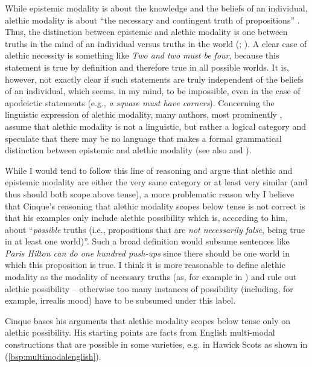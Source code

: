 \noindent While epistemic modality is about the knowledge and the beliefs of an individual, alethic modality is about ``the necessary and contingent truth of propositions'' \citep[8--9]{nuyts2006modality}. Thus, the distinction between epistemic and alethic modality is one between truths in the mind of an individual versus truths in the world (\citealt[11]{palmer1986mood}; \citealt[9]{nuyts2006modality}). A clear case of alethic necessity is something like \textit{Two and two must be four}, because this statement is true by definition and therefore true in all possible worlds. It is, however, not exactly clear if such statements are truly independent of the beliefs of an individual, which seems, in my mind, to be impossible, even in the case of apodeictic statements (e.g., \textit{a square must have corners}). Concerning the linguistic expression of alethic modality, many authors, most prominently \citet[11]{palmer1986mood}, assume that alethic modality is not a linguistic, but rather a logical category and speculate that there may be no language that makes a formal grammatical distinction between epistemic and alethic modality (see also \citealt[28]{nuyts2000epistemic} and \citealt{von2006modality}).

While I would tend to follow this line of reasoning and argue that alethic and epistemic modality are either the very same category or at least very similar (and thus should both scope above tense), a more problematic reason why I believe that Cinque's reasoning that alethic modality scopes below tense is not correct is that his examples only include alethic possibility which is, according to him, about ``\textit{possible} truths (i.e., propositions that are \textit{not necessarily false}, being true in at least one world)''. Such a broad definition would subsume sentences like \textit{Paris Hilton can do one hundred push-ups} since there should be one world in which this proposition is true. I think it is more reasonable to define alethic modality as the modality of necessary truths (as, for example in \citealt{nuyts2000epistemic}) and rule out alethic possibility -- otherwise too many instances of possibility (including, for example, irrealis mood) have to be subsumed under this label. 

Cinque bases his arguments that alethic modality scopes below tense only on alethic possibility. His starting points are facts from English multi-modal constructions that are possible in some varieties, e.g. in Hawick Scots as shown in (\ref{bsp:multimodalenglish}). 

